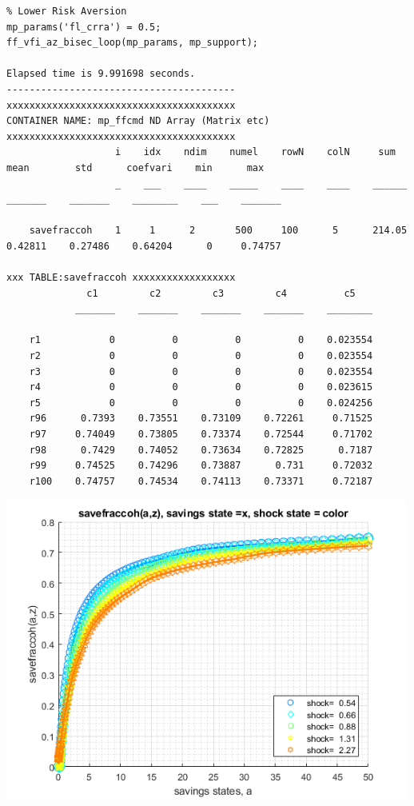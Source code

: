 \documentclass[
]{book}
\begin{document}
\begin{verbatim}
% Lower Risk Aversion
mp_params('fl_crra') = 0.5;
ff_vfi_az_bisec_loop(mp_params, mp_support);

Elapsed time is 9.991698 seconds.
----------------------------------------
xxxxxxxxxxxxxxxxxxxxxxxxxxxxxxxxxxxxxxxx
CONTAINER NAME: mp_ffcmd ND Array (Matrix etc)
xxxxxxxxxxxxxxxxxxxxxxxxxxxxxxxxxxxxxxxx
                   i    idx    ndim    numel    rowN    colN     sum       mean        std      coefvari    min      max  
                   _    ___    ____    _____    ____    ____    ______    _______    _______    ________    ___    _______

    savefraccoh    1     1      2       500     100      5      214.05    0.42811    0.27486    0.64204      0     0.74757

xxx TABLE:savefraccoh xxxxxxxxxxxxxxxxxx
              c1         c2         c3         c4          c5   
            _______    _______    _______    _______    ________

    r1            0          0          0          0    0.023554
    r2            0          0          0          0    0.023554
    r3            0          0          0          0    0.023554
    r4            0          0          0          0    0.023615
    r5            0          0          0          0    0.024256
    r96      0.7393    0.73551    0.73109    0.72261     0.71525
    r97     0.74049    0.73805    0.73374    0.72544     0.71702
    r98      0.7429    0.74052    0.73634    0.72825      0.7187
    r99     0.74525    0.74296    0.73887      0.731     0.72032
    r100    0.74757    0.74534    0.74113    0.73371     0.72187
\end{verbatim}

\includegraphics[width=5.20833in,height=\textheight]{img/fx_vfi_az_bisec_loop_images/figure_2.png}
\end{document}
